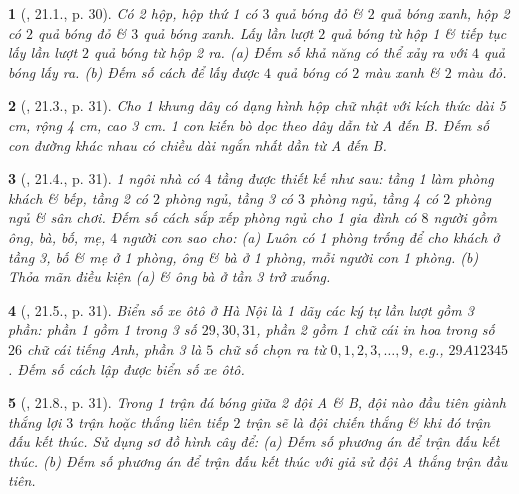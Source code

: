 \documentclass{article}
\newtheorem{baitoan}{}
\begin{document}
\begin{baitoan}[\cite{Hai_Hung_Thu_Tung_ncpt_Toan_10_tap_2}, 21.1., p. 30]
	Có 2 hộp, hộp thứ 1 có $3$ quả bóng đỏ \& $2$ quả bóng xanh, hộp 2 có $2$ quả bóng đỏ \& $3$ quả bóng xanh. Lấy lần lượt $2$ quả bóng từ hộp 1 \& tiếp tục lấy lần lượt $2$ quả bóng từ hộp 2 ra. (a) Đếm số khả năng có thể xảy ra với $4$ quả bóng lấy ra. (b) Đếm số cách để lấy được $4$ quả bóng có $2$ màu xanh \& $2$ màu đỏ.
\end{baitoan}

\begin{baitoan}[\cite{Hai_Hung_Thu_Tung_ncpt_Toan_10_tap_2}, 21.3., p. 31]
	Cho 1 khung dây có dạng hình hộp chữ nhật với kích thức dài {\rm5 cm}, rộng {\rm4 cm}, cao {\rm3 cm}. 1 con kiến bò dọc theo dây dẫn từ A đến B. Đếm số con đường khác nhau có chiều dài ngắn nhất dần từ A đến B.
\end{baitoan}

\begin{baitoan}[\cite{Hai_Hung_Thu_Tung_ncpt_Toan_10_tap_2}, 21.4., p. 31]
	1 ngôi nhà có $4$ tầng được thiết kế như sau: tầng 1 làm phòng khách \& bếp, tầng 2 có $2$ phòng ngủ, tầng 3 có $3$ phòng ngủ, tầng 4 có $2$ phòng ngủ \& sân chơi. Đếm số cách sắp xếp phòng ngủ cho 1 gia đình có $8$ người gồm ông, bà, bố, mẹ, $4$ người con sao cho: (a) Luôn có 1 phòng trống để cho khách ở tầng 3, bố \& mẹ ở 1 phòng, ông \& bà ở 1 phòng, mỗi người con 1 phòng. (b) Thỏa mãn điều kiện (a) \& ông bà ở tần 3 trở xuống.
\end{baitoan}

\begin{baitoan}[\cite{Hai_Hung_Thu_Tung_ncpt_Toan_10_tap_2}, 21.5., p. 31]
	Biển số xe ôtô ở Hà Nội là 1 dãy các ký tự lần lượt gồm 3 phần: phần 1 gồm 1 trong 3 số $29,30,31$, phần 2 gồm 1 chữ cái in hoa trong số $26$ chữ cái tiếng Anh, phần 3 là $5$ chữ số chọn ra từ $0,1,2,3,\ldots,9$, e.g., $29A12345$. Đếm số cách lập được biển số xe ôtô.
\end{baitoan}

\begin{baitoan}[\cite{Hai_Hung_Thu_Tung_ncpt_Toan_10_tap_2}, 21.8., p. 31]
	Trong 1 trận đá bóng giữa 2 đội A \& B, đội nào đầu tiên giành thắng lợi $3$ trận hoặc thắng liên tiếp $2$ trận sẽ là đội chiến thắng \& khi đó trận đấu kết thúc. Sử dụng sơ đồ hình cây để: (a) Đếm số phương án để trận đấu kết thúc. (b) Đếm số phương án để trận đấu kết thúc với giả sử đội A thắng trận đầu tiên.
\end{baitoan}
\end{document}
